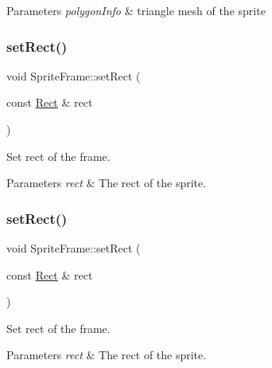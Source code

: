 \begin{DoxyParams}{Parameters}
{\em polygon\+Info} & triangle mesh of the sprite \\
\hline
\end{DoxyParams}
\mbox{\label{classSpriteFrame_a97b4f437895f61f48aa6462930a5c298}} 
\subsubsection{\texorpdfstring{set\+Rect()}{setRect()}\hspace{0.1cm}{\footnotesize\ttfamily [1/2]}}
{\footnotesize\ttfamily void Sprite\+Frame\+::set\+Rect (\begin{DoxyParamCaption}\item[{const \hyperlink{classRect}{Rect} \&}]{rect }\end{DoxyParamCaption})}

Set rect of the frame.


\begin{DoxyParams}{Parameters}
{\em rect} & The rect of the sprite. \\
\hline
\end{DoxyParams}
\mbox{\label{classSpriteFrame_a97b4f437895f61f48aa6462930a5c298}} 
\subsubsection{\texorpdfstring{set\+Rect()}{setRect()}\hspace{0.1cm}{\footnotesize\ttfamily [2/2]}}
{\footnotesize\ttfamily void Sprite\+Frame\+::set\+Rect (\begin{DoxyParamCaption}\item[{const \hyperlink{classRect}{Rect} \&}]{rect }\end{DoxyParamCaption})}

Set rect of the frame.


\begin{DoxyParams}{Parameters}
{\em rect} & The rect of the sprite. \\
\hline
\end{DoxyParams}
\mbox{\label{classSpriteFrame_a7807d131620f961dd2ebc379c856f132}} 
